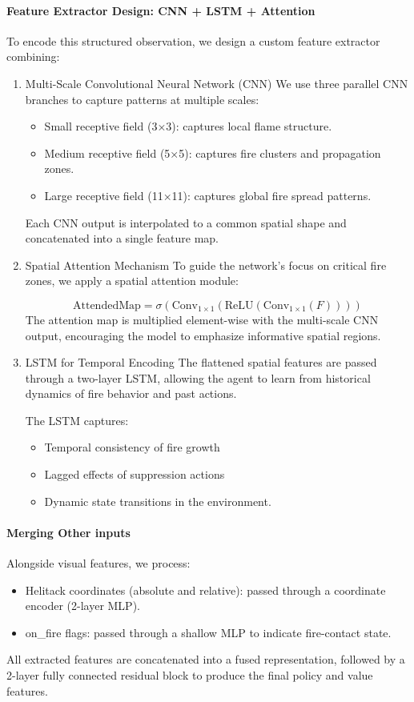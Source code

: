 \documentclass[conference]{IEEEtran}
\begin{document}
\paragraph{Feature Extractor Design: CNN + LSTM + Attention}
To encode this structured observation, we design a custom feature extractor combining:
\begin{enumerate}
    \item Multi-Scale Convolutional Neural Network (CNN)
    We use three parallel CNN branches to capture patterns at multiple scales:
    \begin{itemize}
        \item Small receptive field (3×3): captures local flame structure.
        \item Medium receptive field (5×5): captures fire clusters and propagation zones.
        \item Large receptive field (11×11): captures global fire spread patterns.
    \end{itemize}
    Each CNN output is interpolated to a common spatial shape and concatenated into a single feature map.
    \item Spatial Attention Mechanism
    To guide the network’s focus on critical fire zones, we apply a spatial attention module:

    \[
    \text{AttendedMap} = \sigma\left( \text{Conv}_{1 \times 1} \left( \text{ReLU} \left( \text{Conv}_{1 \times 1}(F) \right) \right) \right)
    \]
    The attention map is multiplied element-wise with the multi-scale CNN output, encouraging the model to emphasize informative spatial regions.

    \item LSTM for Temporal Encoding
    The flattened spatial features are passed through a two-layer LSTM, allowing the agent to learn from historical dynamics of fire behavior and past actions.

    The LSTM captures:
    \begin{itemize}
        \item Temporal consistency of fire growth
        \item Lagged effects of suppression actions
        \item Dynamic state transitions in the environment.
    \end{itemize}
\end{enumerate}

\paragraph{Merging Other inputs}
Alongside visual features, we process:
\begin{itemize}
    \item Helitack coordinates (absolute and relative): passed through a coordinate encoder (2-layer MLP).
    \item on\_fire flags: passed through a shallow MLP to indicate fire-contact state.
\end{itemize}
All extracted features are concatenated into a fused representation, followed by a 2-layer fully connected residual block to produce the final policy and value features.
\end{document}
